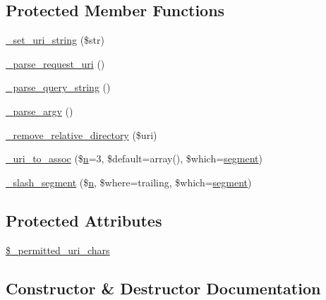 \subsection*{Protected Member Functions}
\begin{DoxyCompactItemize}
\item 
\mbox{\hyperlink{class_c_i___u_r_i_a81a4c4d50fbac24b9ae091f9cfcaade3}{\+\_\+set\+\_\+uri\+\_\+string}} (\$str)
\item 
\mbox{\hyperlink{class_c_i___u_r_i_ae2e75a6f6657df51c7b6de926979af29}{\+\_\+parse\+\_\+request\+\_\+uri}} ()
\item 
\mbox{\hyperlink{class_c_i___u_r_i_a2bb6abbe64a923ffef79a4a4c3da93db}{\+\_\+parse\+\_\+query\+\_\+string}} ()
\item 
\mbox{\hyperlink{class_c_i___u_r_i_a336e05909197d401613263ebdab6550c}{\+\_\+parse\+\_\+argv}} ()
\item 
\mbox{\hyperlink{class_c_i___u_r_i_a01fdc82a66a1611d3e5d42461c1ad59c}{\+\_\+remove\+\_\+relative\+\_\+directory}} (\$uri)
\item 
\mbox{\hyperlink{class_c_i___u_r_i_a8a4949bcf405b03c1bf2cd94e689a0c7}{\+\_\+uri\+\_\+to\+\_\+assoc}} (\$\mbox{\hyperlink{cli_2error__php_8php_a2e6b16bbc42094e4c51ade3c10afdcf1}{n}}=3, \$default=array(), \$which=\textquotesingle{}\mbox{\hyperlink{class_c_i___u_r_i_aeea297fbd38079886a2de35d633c1ed5}{segment}}\textquotesingle{})
\item 
\mbox{\hyperlink{class_c_i___u_r_i_a98974ace6ccf1b5e0923a7de9018095a}{\+\_\+slash\+\_\+segment}} (\$\mbox{\hyperlink{cli_2error__php_8php_a2e6b16bbc42094e4c51ade3c10afdcf1}{n}}, \$where=\textquotesingle{}trailing\textquotesingle{}, \$which=\textquotesingle{}\mbox{\hyperlink{class_c_i___u_r_i_aeea297fbd38079886a2de35d633c1ed5}{segment}}\textquotesingle{})
\end{DoxyCompactItemize}
\subsection*{Protected Attributes}
\begin{DoxyCompactItemize}
\item 
\mbox{\hyperlink{class_c_i___u_r_i_a5f6c67e88b35c1006295f41bc878f8b7}{\$\+\_\+permitted\+\_\+uri\+\_\+chars}}
\end{DoxyCompactItemize}


\subsection{Constructor \& Destructor Documentation}
\mbox{\label{class_c_i___u_r_i_a095c5d389db211932136b53f25f39685}} 
